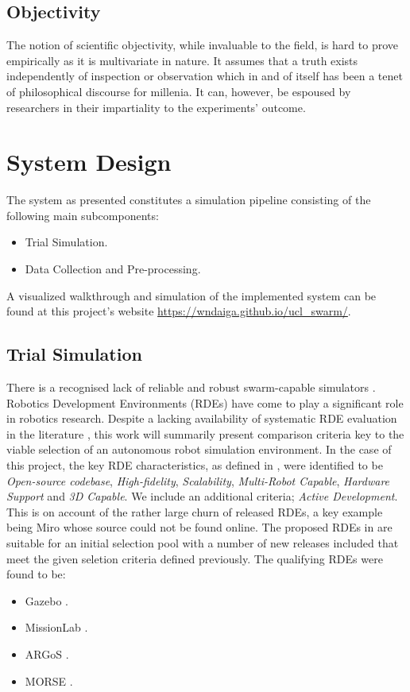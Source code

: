 \documentclass{report}
\begin{document}
\subsection{Objectivity}

The notion of scientific objectivity, while invaluable to the field, is hard to prove empirically as it is multivariate in nature. It assumes that a truth exists independently of inspection or observation which in and of itself has been a tenet of philosophical discourse for millenia. It can, however, be espoused by researchers in their impartiality to the experiments' outcome.

\newpage

\section{System Design} \label{system_design}
The system as presented constitutes a simulation pipeline consisting of the following main subcomponents:
\begin{itemize}
	\item Trial Simulation.
	\item Data Collection and Pre-processing.
\end{itemize}

A visualized walkthrough and simulation of the implemented system can be found at this project's website \url{https://wndaiga.github.io/ucl_swarm/}.

\subsection{Trial Simulation}
There is a recognised lack of reliable and robust swarm-capable simulators \cite{Noronha2016}. Robotics Development Environments (RDEs) have come to play a significant role in robotics research. Despite a lacking availability of systematic RDE evaluation in the literature \cite{Kramer2007}, this work will summarily present comparison criteria key to the viable selection of an autonomous robot simulation environment. In the case of this project, the key RDE characteristics, as defined in \cite{Kramer2007}, were identified to be \textit{Open-source codebase}, \textit{High-fidelity}, \textit{Scalability}, \textit{Multi-Robot Capable}, \textit{Hardware Support} and \textit{3D Capable}. We include an additional criteria; \textit{Active Development}. This is on account of the rather large churn of released RDEs, a key example being Miro \cite{Enderle2001} whose source could not be found online. The proposed RDEs in \cite{Kramer2007} are suitable for an initial selection pool with a number of new releases included that meet the given seletion criteria defined previously. The qualifying RDEs were found to be:
\begin{itemize}
	\item Gazebo \cite{Koenig2004}.
	\item MissionLab \cite{MISSIONLAB}.
	\item ARGoS \cite{Pinciroli2011}.
	\item MORSE \cite{Morse2011}.
\end{itemize}
\end{document}
